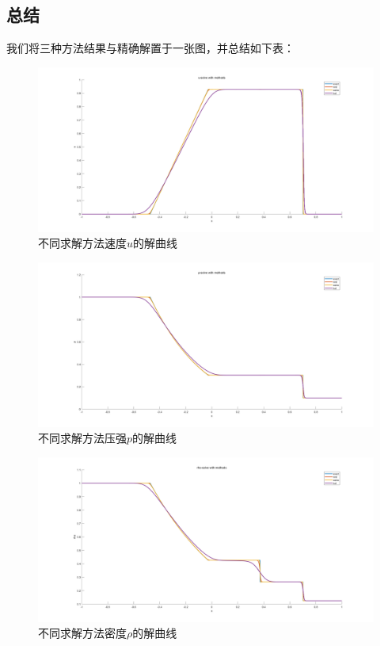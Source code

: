 \documentclass[12pt,a4paper]{article}%
\begin{document}
		\subsection{总结}
		我们将三种方法结果与精确解置于一张图，并总结如下表：
		\begin{figure}[H]
			\centering
			\begin{minipage}{1\textwidth}
				\centering
				\includegraphics[width=\textwidth]{./fig/u-2.png}
				\caption{\fontsize{10pt}{15pt}\selectfont 不同求解方法速度$u$的解曲线}
			\end{minipage}
		\end{figure}
		\begin{figure}[H]
			\centering
			\begin{minipage}{1\textwidth}
				\centering
				\includegraphics[width=\textwidth]{./fig/p-2.png}
				\caption{\fontsize{10pt}{15pt}\selectfont 不同求解方法压强$p$的解曲线}
			\end{minipage}
		\end{figure}
		\begin{figure}[H]
			\centering
			\begin{minipage}{1\textwidth}
				\centering
				\includegraphics[width=\textwidth]{./fig/rho-2.png}
				\caption{\fontsize{10pt}{15pt}\selectfont 不同求解方法密度$\rho$的解曲线}
			\end{minipage}
		\end{figure}
\end{document}
